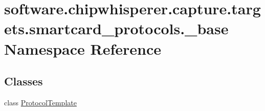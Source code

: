 \hypertarget{namespacesoftware_1_1chipwhisperer_1_1capture_1_1targets_1_1smartcard__protocols_1_1__base}{}\section{software.\+chipwhisperer.\+capture.\+targets.\+smartcard\+\_\+protocols.\+\_\+base Namespace Reference}
\label{namespacesoftware_1_1chipwhisperer_1_1capture_1_1targets_1_1smartcard__protocols_1_1__base}
\subsection*{Classes}
\begin{DoxyCompactItemize}
\item 
class \hyperlink{classsoftware_1_1chipwhisperer_1_1capture_1_1targets_1_1smartcard__protocols_1_1__base_1_1ProtocolTemplate}{Protocol\+Template}
\end{DoxyCompactItemize}
